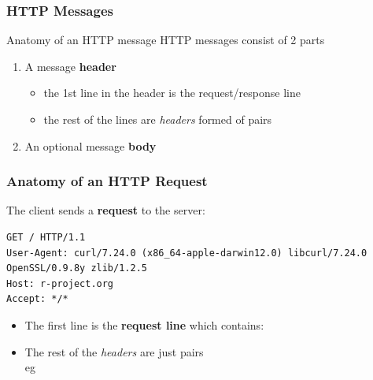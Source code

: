 \documentclass{beamer}\usepackage[]{graphicx}\usepackage[]{color}
\begin{document}

\begin{frame}
\frametitle{HTTP Messages}

\begin{block}{Anatomy of an HTTP message}
HTTP messages consist of 2 parts  
\begin{enumerate}
 \item A message \textbf{header}
 \begin{itemize}
  \item the 1st line in the header is the request/response line
  \item the rest of the lines are \textit{headers} formed of  pairs
 \end{itemize}
 \item An optional message \textbf{body}
\end{enumerate}
\end{block}

\end{frame}


\begin{frame}[fragile]
\frametitle{Anatomy of an HTTP Request}

The client  sends a \textbf{request} to the server:

{\tiny
\begin{verbatim}
GET / HTTP/1.1
User-Agent: curl/7.24.0 (x86_64-apple-darwin12.0) libcurl/7.24.0 OpenSSL/0.9.8y zlib/1.2.5
Host: r-project.org
Accept: */*
\end{verbatim}
}

\begin{itemize}
 \item The first line is the \textbf{request line} which contains: \\
 {\footnotesize {}}
 \item The rest of the \textit{headers} are just  pairs \\
{\footnotesize eg }
\end{itemize}

\end{frame}

\end{document}
